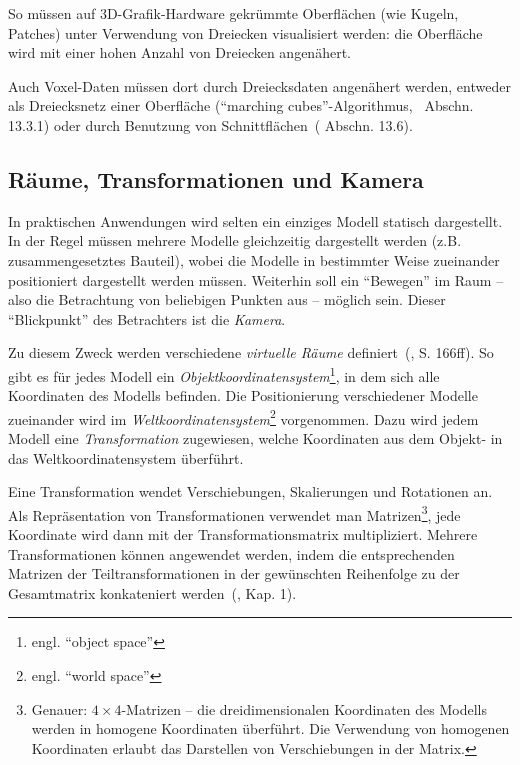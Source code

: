 \documentclass[twoside,a4paper,fleqn,12pt]{book}
\begin{document}
So müssen auf 3D-Grafik-Hardware gekrümmte Oberflächen (wie Kugeln, Patches) unter Verwendung von Dreiecken visualisiert werden:
die Oberfläche wird mit einer hohen Anzahl von Dreiecken angenähert.

Auch Voxel-Daten müssen dort durch Dreiecksdaten angenähert werden,
entweder als Dreiecksnetz einer Oberfläche (``marching cubes''-Algorithmus,~\cite{watt_de} Abschn. 13.3.1)
oder durch Benutzung von Schnittflächen~(\cite{watt_de} Abschn. 13.6).


\subsection{Räume, Transformationen und Kamera}

In praktischen Anwendungen wird selten ein einziges Modell statisch dargestellt. In der Regel müssen mehrere Modelle
gleichzeitig dargestellt werden (z.B. zusammengesetztes Bauteil), wobei die Modelle
in bestimmter Weise zueinander positioniert dargestellt werden müssen. Weiterhin soll ein "`Bewegen"' im Raum --
also die Betrachtung von beliebigen Punkten aus -- möglich sein. Dieser "`Blickpunkt"' des Betrachters ist die \emph{Kamera}.

Zu diesem Zweck werden verschiedene \emph{virtuelle Räume} definiert~(\cite{watt_de}, S. 166ff).
 So gibt es für jedes Modell ein \emph{Objektkoordinatensystem}\footnote{engl. ``object space''},
in dem sich alle Koordinaten des Modells befinden. 
Die Positionierung verschiedener Modelle zueinander wird im \emph{Weltkoordinatensystem}\footnote{engl. ``world space''} vorgenommen. 
Dazu wird jedem Modell eine \emph{Transformation} zugewiesen, welche Koordinaten aus dem Objekt- in das
Weltkoordinatensystem überführt. 

Eine Transformation wendet Verschiebungen, Skalierungen und Rotationen an. Als Repräsentation von Transformationen
verwendet man Matrizen\footnote{Genauer: $4 \times 4$-Matrizen -- die dreidimensionalen Koordinaten des Modells werden
in homogene Koordinaten überführt. Die Verwendung von homogenen Koordinaten
erlaubt das Darstellen von Verschiebungen in der Matrix.}, %
jede Koordinate wird dann mit der Transformationsmatrix multipliziert. Mehrere Transformationen können angewendet werden, indem 
die entsprechenden Matrizen der Teiltransformationen in der gewünschten Reihenfolge zu der Gesamtmatrix konkateniert werden~(\cite{watt_de}, Kap. 1).
\end{document}
